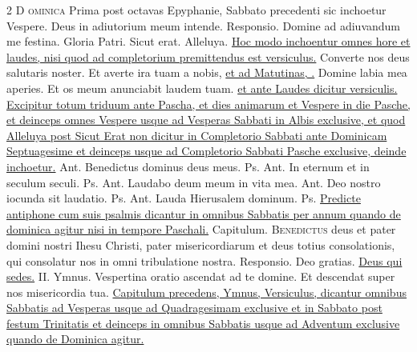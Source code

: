 \begin{multicols*}{2}
\lettrine[lines=2]{\zallmancaps \color{Blue} D}{\color{Red} ominica} {\color{Red} Prima post octavas Epyphanie, Sabbato precedenti sic inchoetur Vespere.} Deus in adiutorium meum intende. {\color{Red} Responsio.} Domine ad adiuvandum me festina. Gloria Patri. Sicut erat. Alleluya. \ul{Hoc modo inchoentur omnes hore et laudes, nisi quod ad completorium premittendus est versiculus.} Converte nos deus salutaris noster. Et averte ira tuam a nobis, \ul{et ad Matutinas, \Vbar .} Domine labia mea aperies. Et os meum anunciabit laudem tuam. \ul{et ante Laudes dicitur versiculis. Excipitur totum triduum ante Pascha, et dies animarum et Vespere in die Pasche, et deinceps omnes Vespere usque ad Vesperas Sabbati in Albis exclusive, et quod Alleluya post Sicut Erat non dicitur in Completorio Sabbati ante Dominicam Septuagesime et deinceps usque ad Completorio Sabbati Pasche exclusive, deinde inchoetur.} {\color{Red} Ant.} Benedictus dominus deus meus. {\color{Red} Ps.}  {\color{Red} Ant.} In eternum et in seculum seculi. {\color{Red} Ps.}  {\color{Red} Ant.} Laudabo deum meum in vita mea.  {\color{Red} Ant.} Deo nostro iocunda sit laudatio. {\color{Red} Ps.}  {\color{Red} Ant.} Lauda Hierusalem dominum. {\color{Red} Ps.} 
\newline \ul{Predicte antiphone cum suis psalmis dicantur in omnibus Sabbatis per annum quando de dominica agitur nisi in tempore Paschali.} {\color{Red} Capitulum.}
\lettrine[lines=2]{\zallmancaps \color{Red} B}{enedictus} deus et pater domini nostri Ihesu Christi, pater misericordiarum et deus totius consolationis, qui consolatur nos in omni tribulatione nostra. {\color{Red} Responsio.} Deo gratias. \R \hyperlink{deus-qui-sedes}{Deus qui sedes.} {\color{Red} II. Ymnus.}
\newline \V Vespertina oratio ascendat ad te domine.
\newline \R Et descendat super nos misericordia tua.
\newline \ul{Capitulum precedens, Ymnus, Versiculus, dicantur omnibus Sabbatis ad Vesperas usque ad Quadragesimam exclusive et in Sabbato post festum Trinitatis et deinceps in omnibus Sabbatis usque ad Adventum exclusive quando de Dominica agitur.}

\end{multicols*}
